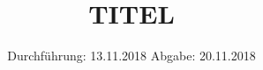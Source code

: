 

\subject{VERSUCH NUMMER}
\title{TITEL}
\date{%
  Durchführung: 13.11.2018
  \hspace{3em}
  Abgabe: 20.11.2018
}



\maketitle
\thispagestyle{empty}
\tableofcontents
\newpage






\printbibliography{}


